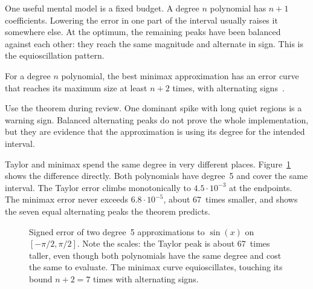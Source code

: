 \documentclass[manuscript, nonacm]{acmart}
\newcommand{\approxdata}[1]{tools/proofs/math/approx_doc/data/#1}
\begin{document}
  One useful mental model is a fixed budget. A degree $n$ polynomial has
  $n + 1$ coefficients. Lowering the error in one part of the interval usually
  raises it somewhere else. At the optimum, the remaining peaks have been
  balanced against each other: they reach the same magnitude and alternate in
  sign. This is the equioscillation pattern.

  For a degree $n$ polynomial, the best minimax approximation has an error
  curve that reaches its maximum size at least $n + 2$ times, with alternating
  signs~\cite{muller}.

  Use the theorem during review. One dominant spike with long quiet regions is
  a warning sign. Balanced alternating peaks do not prove the whole
  implementation, but they are evidence that the approximation is using its degree
  for the intended interval.

  Taylor and minimax spend the same degree in very different places.
  Figure~\ref{fig:minimaxcompare} shows the difference directly. Both
  polynomials have degree~5 and cover the same interval. The Taylor error
  climbs monotonically to $4.5 \cdot 10^{-3}$ at the endpoints. The minimax
  error never exceeds $6.8 \cdot 10^{-5}$, about 67~times smaller, and shows
  the seven equal alternating peaks the theorem predicts.

  \begin{figure}[tbp]
    \centering
    \hfill
    \caption{Signed error of two degree~5 approximations to $\sin(x)$ on
      $[-\pi/2,\pi/2]$. Note the scales: the Taylor peak is about 67~times
      taller, even though both polynomials have the same degree and cost the
      same to evaluate. The minimax curve equioscillates, touching its bound
      $n + 2 = 7$ times with alternating signs.}
    \label{fig:minimaxcompare}
  \end{figure}
\end{document}
